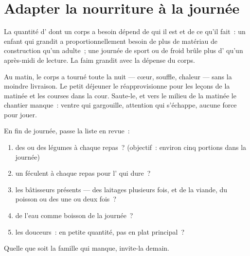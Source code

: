 \section{Adapter la nourriture à la journée}

\begin{proposition}\label{prop:g3:balanced-diet:needs}
La quantité d' dont un corps a besoin dépend de qui il est et
de ce qu'il fait~: un enfant qui grandit a proportionnellement
besoin de plus de matériau de construction qu'un adulte~; une
journée de sport ou de froid brûle plus d' qu'un après-midi
de lecture. La faim grandit avec la dépense du corps.
\end{proposition}
\admitted

\begin{example}\label{ex:g3:balanced-diet:breakfast}
Au matin, le corps a tourné toute la nuit --- cœur, souffle, chaleur
--- sans la moindre livraison. Le petit déjeuner le réapprovisionne
pour les leçons de la matinée et les courses dans la cour. Saute-le,
et vers le milieu de la matinée le chantier manque~: ventre qui
gargouille, attention qui s'échappe, aucune force pour jouer.
\end{example}

\begin{method}\label{met:g3:balanced-diet:check}
En fin de journée, passe la liste en revue~:
\begin{enumerate}
  \item des  ou des légumes à chaque repas~? (objectif~:
        environ cinq portions dans la journée)
  \item un féculent à chaque repas pour l' qui dure~?
  \item les bâtisseurs présents --- des laitages plusieurs fois, et
        de la viande, du poisson ou des  une ou deux fois~?
  \item de l'eau comme boisson de la journée~?
  \item les douceurs~: en petite quantité, pas en plat principal~?
\end{enumerate}
Quelle que soit la famille qui manque, invite-la demain.
\end{method}

